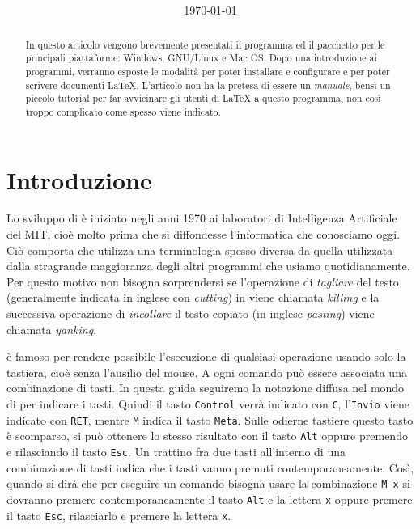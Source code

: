 \documentclass[11pt,a4paper]{article}
\title{\bfseries\titolo}
\author{\autorea \and \autoreb \and \autorec}
\date{\today}
\begin{document}
\maketitle
\begin{abstract}
  \noindent In questo articolo vengono brevemente presentati il
  programma \emacs{} ed il pacchetto \auctex{} per le principali
  piattaforme: Windows, GNU/Linux e Mac OS. Dopo una introduzione ai
  programmi, verranno esposte le modalità per poter installare e
  configurare \emacs{} e \auctex{} per poter scrivere documenti
  \LaTeX{}. L'articolo non ha la pretesa di essere un \emph{manuale},
  bensì un piccolo tutorial per far avvicinare gli utenti di \LaTeX{}
  a questo programma, non così troppo complicato come spesso viene
  indicato.
\end{abstract}

\begin{multicols}{2}
  \tableofcontents
\end{multicols}

\section{Introduzione}
\label{sec:intro}

\textcolor{red}{\lipsum[1]}

Lo sviluppo di \emacs{} è iniziato negli anni 1970 ai laboratori di Intelligenza
Artificiale del MIT, cioè molto prima che si diffondesse l'informatica che
conosciamo oggi.  Ciò comporta che \emacs{} utilizza una terminologia spesso
diversa da quella utilizzata dalla stragrande maggioranza degli altri programmi
che usiamo quotidianamente.  Per questo motivo non bisogna sorprendersi se
l'operazione di \emph{tagliare} del testo (generalmente indicata in inglese con
\emph{cutting}) in \emacs{} viene chiamata \emph{killing} e la successiva
operazione di \emph{incollare} il testo copiato (in inglese \emph{pasting})
viene chiamata \emph{yanking}.

\emacs{} è famoso per rendere possibile l'esecuzione di qualsiasi operazione
usando solo la tastiera, cioè senza l'ausilio del mouse.  A ogni comando può
essere associata una combinazione di tasti.  In questa guida seguiremo la
notazione diffusa nel mondo di \emacs{} per indicare i tasti.  Quindi il tasto
\verb!Control! verrà indicato con \verb!C!, l'\verb!Invio! viene indicato con
\verb!RET!, mentre \verb!M! indica il tasto \verb!Meta!.  Sulle odierne tastiere
questo tasto è scomparso, si può ottenere lo stesso risultato con il tasto
\verb!Alt! oppure premendo e rilasciando il tasto \verb!Esc!.  Un trattino fra
due tasti all'interno di una combinazione di tasti indica che i tasti vanno
premuti contemporaneamente.  Così, quando si dirà che per eseguire un comando
bisogna usare la combinazione \verb!M-x! si dovranno premere contemporaneamente
il tasto \verb!Alt! e la lettera \verb!x! oppure premere il tasto \verb!Esc!,
rilasciarlo e premere la lettera \verb!x!.
\end{document}
